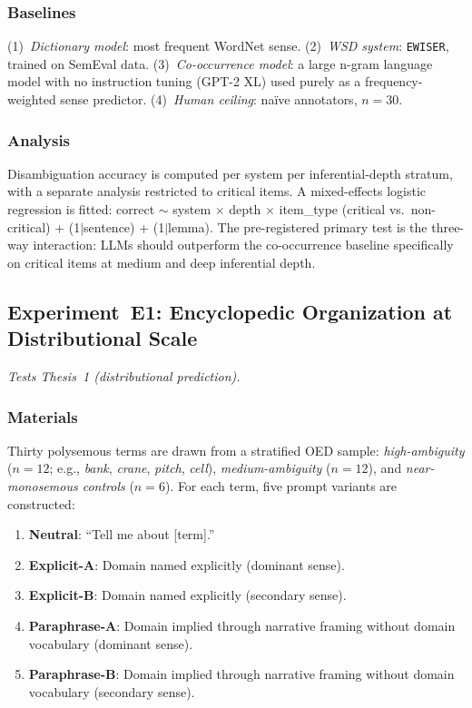 \documentclass[12pt,a4paper]{article}
\begin{document}
\subsubsection{Baselines}

(1)~\emph{Dictionary model}: most frequent WordNet sense. (2)~\emph{WSD
system}: \citet{Bevilacqua2020} \texttt{EWISER}, trained on SemEval data.
(3)~\emph{Co-occurrence model}: a large n-gram language model with no
instruction tuning (GPT-2 XL) used purely as a frequency-weighted sense
predictor. (4)~\emph{Human ceiling}: na\"ive annotators, $n = 30$.

\subsubsection{Analysis}

Disambiguation accuracy is computed per system per inferential-depth stratum,
with a separate analysis restricted to critical items. A mixed-effects logistic
regression is fitted: correct $\sim$ system $\times$ depth $\times$ item\_type
(critical vs.\ non-critical) + (1$|$sentence) + (1$|$lemma). The pre-registered
primary test is the three-way interaction: LLMs should outperform the
co-occurrence baseline specifically on critical items at medium and deep
inferential depth.

\subsection{Experiment~E1: Encyclopedic Organization at Distributional Scale}
\label{sec:exp1}

\emph{Tests Thesis~1 (distributional prediction).}

\subsubsection{Materials}

Thirty polysemous terms are drawn from a stratified OED sample:
\emph{high-ambiguity} ($n = 12$; e.g., \emph{bank}, \emph{crane},
\emph{pitch}, \emph{cell}), \emph{medium-ambiguity} ($n = 12$), and
\emph{near-monosemous controls} ($n = 6$). For each term, five prompt
variants are constructed:

\begin{enumerate}
\item \textbf{Neutral}: ``Tell me about [term].''
\item \textbf{Explicit-A}: Domain named explicitly (dominant sense).
\item \textbf{Explicit-B}: Domain named explicitly (secondary sense).
\item \textbf{Paraphrase-A}: Domain implied through narrative framing
      without domain vocabulary (dominant sense).
\item \textbf{Paraphrase-B}: Domain implied through narrative framing
      without domain vocabulary (secondary sense).
\end{enumerate}
\end{document}
